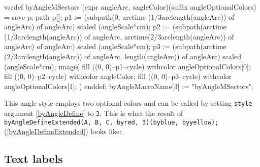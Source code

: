 \documentclass{ltxdoc}
\begin{document}
\begin{MetaPostCode}	
vardef byAngleMSectors (expr angleArc, angleColor)(suffix angleOptionalColors) =
    save p;
    path p[];
    p1 := (subpath(0, arctime (1/3arclength(angleArc)) of angleArc) 
    	of angleArc) 
    	scaled (angleScale*cm);
    p2 := (subpath(arctime (1/3arclength(angleArc)) 
    	of angleArc, arctime(2/3arclength(angleArc)) of angleArc) of angleArc) 
    	scaled (angleScale*cm);
    p3 := (subpath(arctime (2/3arclength(angleArc)) 
    	of angleArc, length(angleArc)) of angleArc) 
    	scaled (angleScale*cm);
    image(
        fill ((0, 0)--p1--cycle) withcolor angleOptionalColors[0];
        fill ((0, 0)--p2--cycle) withcolor angleColor;
        fill ((0, 0)--p3--cycle) withcolor angleOptionalColors[1];
    )
enddef;
byAngleMacroName[3] := "byAngleMSectors";
\end{MetaPostCode}

This angle style employs two optional colors and can be called by setting \texttt{style} argument \ref{byAngleDefine} to \texttt{3}. This is what the result of \texttt{byAngleDefineExtended(A, B, C, byred, 3)(byblue, byyellow);} (\ref{byAngleDefineExtended}) looks like:.






\subsection{Text labels}

\end{document}
